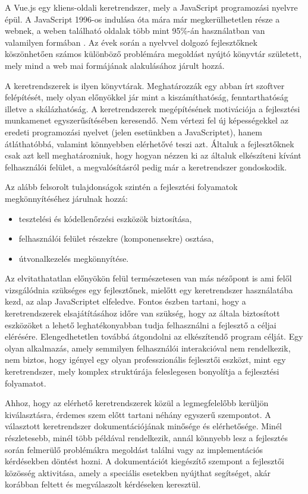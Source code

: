 \documentclass[12pt]{article}
\begin{document}
A Vue.js egy kliens-oldali keretrendszer, mely a JavaScript programozási nyelvre épül. A JavaScript 1996-os indulása óta mára már megkerülhetetlen része a webnek, a weben található oldalak több mint 95\%-án használatban van valamilyen formában \cite{JS_USAGE}. Az évek során a nyelvvel dolgozó fejlesztőknek köszönhetően számos különböző problémára megoldást nyújtó könyvtár született, mely mind a web mai formájának alakulásához járult hozzá.

A keretrendszerek is ilyen könyvtárak. Meghatározzák egy abban írt szoftver felépítését, mely olyan előnyökkel jár mint a kiszámíthatóság, fenntarthatóság illetve a skálázhatóság.
A keretrendszerek megépítésének motivációja a fejlesztési munkamenet egyszerűsítésében keresendő. Nem vértezi fel új képességekkel az eredeti programozási nyelvet (jelen esetünkben a JavaScriptet), hanem átláthatóbbá, valamint könnyebben elérhetővé teszi azt. Általuk a fejlesztőknek csak azt kell meghatározniuk, hogy hogyan nézzen ki az általuk elkészíteni kívánt felhasználói felület, a megvalósításról pedig már a keretrendszer gondoskodik.

Az alább felsorolt tulajdonságok szintén a fejlesztési folyamatok megkönnyítéséhez járulnak hozzá:
\begin{itemize}
\item tesztelési és kódellenőrzési eszközök biztosítása,
\item felhasználói felület részekre (komponensekre) osztása,
\item útvonalkezelés megkönnyítése.
\end{itemize}

Az elvitathatatlan előnyökön felül természetesen van más nézőpont is ami felől vizsgálódnia szükséges egy fejlesztőnek, mielőtt egy keretrendszer használatába kezd, az alap JavaScriptet elfeledve. Fontos észben tartani, hogy a keretrendszerek elsajátításához időre van szükség, hogy az általa biztosított eszközöket a lehető leghatékonyabban tudja felhasználni a fejlesztő a céljai elérésére. Elengedhetetlen továbbá átgondolni az elkészítendő program célját. Egy olyan alkalmazás, amely semmilyen felhasználói interakcióval nem rendelkezik, nem biztos, hogy igényel egy olyan professzionális fejlesztői eszközt, mint egy keretrendszer, mely komplex struktúrája feleslegesen bonyolítja a fejlesztési folyamatot.

Ahhoz, hogy az elérhető keretrendszerek közül a legmegfelelőbb kerüljön kiválasztásra, érdemes szem előtt tartani néhány egyszerű szempontot. A választott keretrendszer dokumentációjának minősége és elérhetősége. Minél részletesebb, minél több példával rendelkezik, annál könnyebb lesz a fejlesztés során felmerülő problémákra megoldást találni vagy az implementációs kérdésekben döntést hozni. A dokumentációt kiegészítő szempont a fejlesztői közösség aktivitása, amely a speciális esetekben nyújthat segítséget, akár korábban feltett és megválaszolt kérdéseken keresztül.
\end{document}
